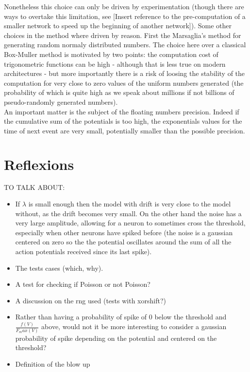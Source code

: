 \documentclass{report}
\begin{document}
	Nonetheless this choice can only be driven by experimentation (though there are ways to overtake this limitation, see [Insert reference to the pre-computation of a smaller network to speed up the beginning of another network]). Some other choices in the method where driven by reason. First the Marsaglia's method for generating random normaly distributed numbers. The choice here over a classical Box-Muller method is motivated by two points: the computation cost of trigonometric functions can be high - although that is less true on modern architectures - but more importantly there is a risk of loosing the stability of the computation for very close to zero values of the uniform numbers generated (the probability of which is quite high as we speak about millions if not billions of pseudo-randomly generated numbers).\\

	An important matter is the subject of the floating numbers precision. Indeed if the cumulative sum of the potentials is too high, the exponentials values for the time of next event are very small, potentially smaller than the possible precision.


\section{Reflexions}
	TO TALK ABOUT:\begin{itemize}
		\item If $\lambda$ is small enough then the model with drift is very close to the model without, as the drift becomes very small. On the other hand the noise has a very large amplitude, allowing for a neuron to sometimes cross the threshold, especially when other neurons have spiked before (the noise is a gaussian centered on zero so the the potential oscillates around the sum of all the action potentials received since its last spike).
		\item The tests cases (which, why).
		\item A test for checking if Poisson or not Poisson?
		\item A discussion on the rng used (tests with xorshift?)
		\item Rather than having a probability of spike of 0 below the threshold and $\frac{f(V)}{F_max(V)}$ above, would not it be more interesting to consider a gaussian probability of spike depending on the potential and centered on the threshold?
		\item Definition of the blow up
	\end{itemize}
\end{document}
